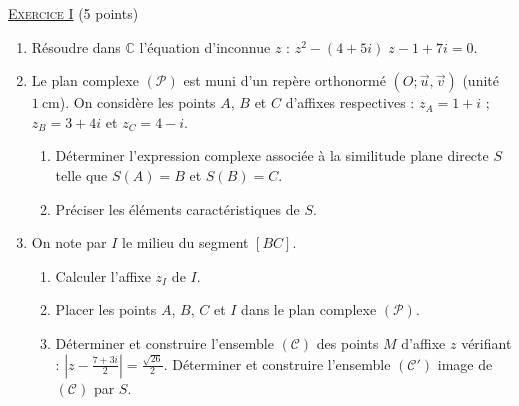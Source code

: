 \providecommand{\CourbeP}{(\mathscr{C}')}
\providecommand{\Courbe}{(\mathscr{C})}
\providecommand{\D}{(\mathscr{D})}
\providecommand{\Plan}{(\mathscr{P})}
\providecommand{\Ouv}{(O ; \vec{u} , \vec{v})}
\providecommand{\cm}{~\mathrm{cm}}
\providecommand{\dx}{~\mathrm{d}x}
\providecommand{\Arg}[1]{\mathrm{Arg}\left( #1 \right)}
\providecommand{\Angl}[2]{\left( \overrightarrow{#1} ; \overrightarrow{#2} \right)}
\noindent \underline{\textsc{Exercice I}} (5 points)
      \begin{enumerate}
            \item R\'esoudre dans $\mathbb{C}$ l'\'equation d'inconnue $z$ : $z^2 - (4 + 5i) \; z - 1 + 7 i = 0$.
            \item Le plan complexe $\Plan$ est muni d'un rep\`ere orthonorm\'e $\Ouv$ (unit\'e $1 \cm$).
                  On consid\`ere les points $A$, $B$ et $C$ d'affixes respectives : 
                  $z_A = 1 + i$ ; $z_B = 3 + 4 i$ et $z_C = 4 - i$.
                  \begin{enumerate}
                        \item D\'eterminer l'expression complexe associ\'ee \`a la similitude plane directe $S$ telle que 
                              $S(A) = B$ et $S(B) = C$.
                        \item Pr\'eciser les \'el\'ements caract\'eristiques de $S$.
                  \end{enumerate}
            \item On note par $I$ le milieu du segment $[BC]$.
                  \begin{enumerate}
                        \item Calculer l'affixe $z_I$ de $I$.
                        \item Placer les points $A$, $B$, $C$ et $I$ dans le plan complexe $\Plan$.
                        \item D\'eterminer et construire l'ensemble $\Courbe$ des points $M$ d'affixe $z$ v\'erifiant :
                              $\displaystyle{
                                    \left|
                                          z - \frac{7 + 3 i}{2}
                                    \right|
                                           = \frac{\sqrt{26}}{2} 
                              }$.
                              D\'eterminer et construire l'ensemble $\CourbeP$ image de $\Courbe$ par $S$.
                  \end{enumerate}
      \end{enumerate}
